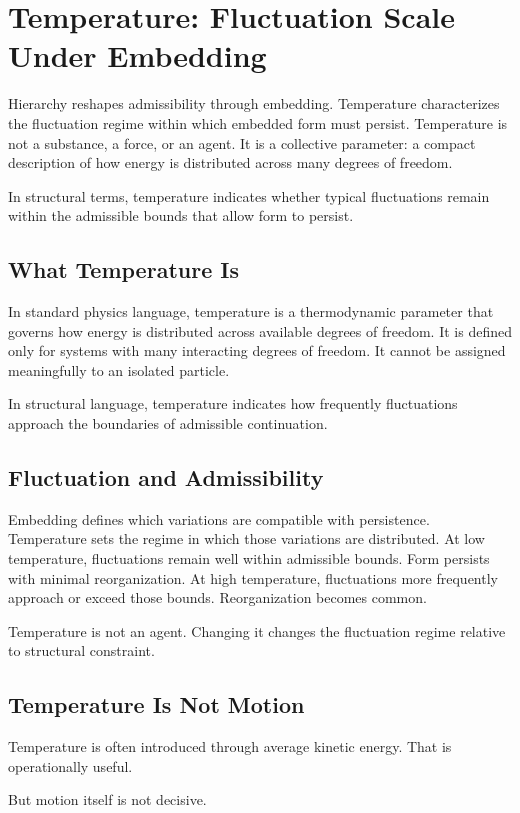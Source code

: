 \documentclass[11pt,twoside,openright]{book}
\begin{document}
\chapter{Temperature: Fluctuation Scale Under Embedding}

Hierarchy reshapes admissibility through embedding. Temperature characterizes the fluctuation regime within which embedded form must persist. Temperature is not a substance, a force, or an agent. It is a collective parameter: a compact description of how energy is distributed across many degrees of freedom.

In structural terms,
temperature indicates whether typical fluctuations
remain within the admissible bounds
that allow form to persist.
\section*{What Temperature Is}

In standard physics language, temperature is a thermodynamic parameter that governs how energy is distributed across available degrees of freedom. It is defined only for systems with many interacting degrees of freedom. It cannot be assigned meaningfully to an isolated particle.

In structural language,
temperature indicates how frequently
fluctuations approach the boundaries
of admissible continuation.
\section*{Fluctuation and Admissibility}

Embedding defines which variations are compatible with persistence. Temperature sets the regime in which those variations are distributed. At low temperature, fluctuations remain well within admissible bounds. Form persists with minimal reorganization. At high temperature, fluctuations more frequently approach or exceed those bounds. Reorganization becomes common.

Temperature is not an agent.
Changing it changes the fluctuation regime
relative to structural constraint.
\section*{Temperature Is Not Motion}

Temperature is often introduced through average kinetic energy. That is operationally useful.

But motion itself is not decisive.
\end{document}
